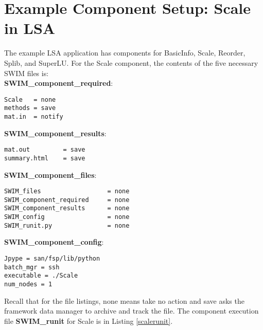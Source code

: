 \section{Example Component Setup: Scale in LSA}

The example LSA application has components for BasicInfo, Scale, Reorder,
Splib, and SuperLU. For the Scale component, the contents of the five 
necessary SWIM files is: \\
{\bf SWIM\_component\_required}:  
\begin{verbatim}
Scale   = none
methods = save
mat.in  = notify
\end{verbatim}
{\bf SWIM\_component\_results}:  
\begin{verbatim}
mat.out         = save
summary.html    = save
\end{verbatim}
{\bf SWIM\_component\_files}:  
\begin{verbatim}
SWIM_files                  = none
SWIM_component_required     = none
SWIM_component_results      = none
SWIM_config                 = none
SWIM_runit.py               = none
\end{verbatim}
{\bf SWIM\_component\_config}:  
\begin{verbatim}
Jpype = san/fsp/lib/python
batch_mgr = ssh
executable = ./Scale
num_nodes = 1
\end{verbatim}
Recall that for the file listings, none means take no action and save asks
the framework data manager to archive and track the file.
The component execution file {\bf SWIM\_runit} for Scale
is in Listing \ref{scalerunit}.
